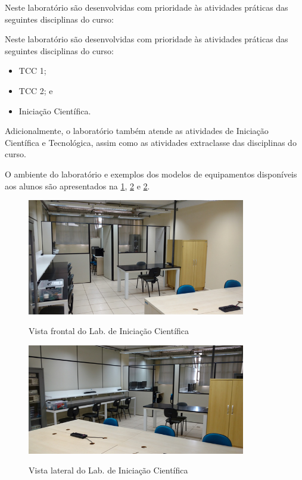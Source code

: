Neste laboratório são desenvolvidas com prioridade às atividades práticas das seguintes disciplinas do curso:

Neste laboratório são desenvolvidas com prioridade às atividades práticas das seguintes disciplinas do curso:

\begin{itemize}
    \item TCC 1;
    \item TCC 2; e
    \item Iniciação Científica.    
\end{itemize}

Adicionalmente, o laboratório também atende as atividades de Iniciação Científica e Tecnológica, assim como as atividades extraclasse das disciplinas do curso.

O ambiente do laboratório e exemplos dos modelos de equipamentos disponíveis aos alunos são apresentados na \ref{fig:lab007.01a}, \ref{fig:lab007.01b} e \ref{fig:lab007.01b}.

\begin{figure}[!htb]
    \centering
    \caption{Vista frontal do Lab. de Iniciação Científica}
    \includegraphics[width=0.85\textwidth]{Caps/Figs/lab007.01a.png}
    \fonte{\utf}
    \label{fig:lab007.01a}
\end{figure}

\begin{figure}[!htb]
    \centering
    \caption{Vista lateral do Lab. de Iniciação Científica}
    \includegraphics[width=0.85\textwidth]{Caps/Figs/lab007.01b.png}
    \fonte{\utf}
    \label{fig:lab007.01b}
\end{figure}

